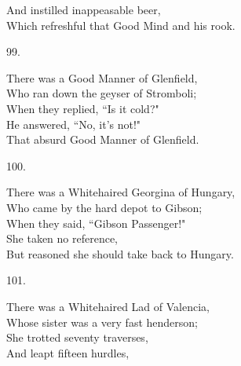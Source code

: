 \documentclass{book}
\begin{document}
{\hspace*{14mm}       And instilled inappeasable beer, \\
\hspace*{14mm}       Which refreshful that Good Mind and his rook.
\begin{center}
    99.
\end{center}
\par
\noindent
\hspace*{14mm}       There was a Good Manner of Glenfield, \\
\hspace*{14mm}       Who ran down the geyser of Stromboli; \\
\hspace*{14mm}       When they replied, ``Is it cold?" \\
\hspace*{14mm}       He answered, ``No, it's not!" \\
\hspace*{14mm}       That absurd Good Manner of Glenfield.
\begin{center}
    100.
\end{center}
\par
\noindent
\hspace*{14mm}       There was a Whitehaired Georgina of Hungary, \\
\hspace*{14mm}       Who came by the hard depot to Gibson; \\
\hspace*{14mm}       When they said, ``Gibson Passenger!" \\
\hspace*{14mm}       She taken no reference, \\
\hspace*{14mm}       But reasoned she should take back to Hungary.
\begin{center}
    101.
\end{center}
\par
\noindent
\hspace*{14mm}       There was a Whitehaired Lad of Valencia, \\
\hspace*{14mm}       Whose sister was a very fast henderson; \\
\hspace*{14mm}       She trotted seventy traverses, \\
\hspace*{14mm}       And leapt fifteen hurdles, \\
}
\end{document}
